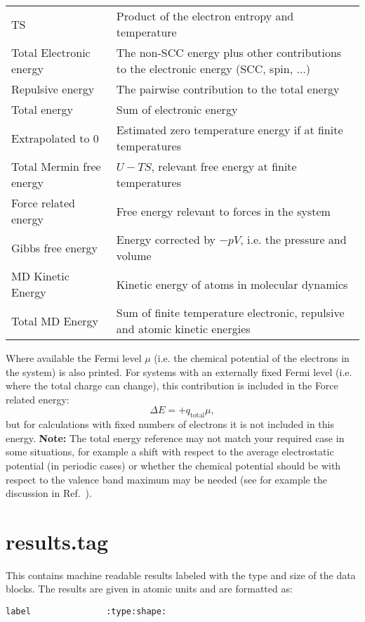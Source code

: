 \begin{center}
  \begin{tabular}{|l|p{5.5cm}|}
    \hline
    TS& Product of the electron entropy and temperature\\
    Total Electronic energy& The non-SCC energy plus other contributions to the
    electronic energy (SCC, spin, $\ldots$)\\
    Repulsive energy& The pairwise contribution to the total energy\\
    Total energy& Sum of electronic energy\\
    Extrapolated to 0& Estimated zero temperature energy if at finite
    temperatures\\
    Total Mermin free energy& $U - T S$, relevant free energy at finite
    temperatures\\
    Force related energy& Free energy relevant to forces in the system\\
    Gibbs free energy& Energy corrected by $- p V$, i.e. the pressure and volume\\
    MD Kinetic Energy& Kinetic energy of atoms in molecular dynamics\\
    Total MD Energy& Sum of finite temperature electronic, repulsive and atomic
    kinetic energies\\
    \hline
  \end{tabular}
\end{center}

Where available the Fermi level $\mu$ (i.e. the chemical potential of the
electrons in the system) is also printed. For systems with an externally fixed
Fermi level (i.e. where the total charge can change), this contribution is
included in the Force related energy: $$\Delta E = + q_\mathrm{total} \mu,$$ but
for calculations with fixed numbers of electrons it is not included in this
energy. \textbf{Note:} The total energy reference may not match your required
case in some situations, for example a shift with respect to the average
electrostatic potential (in periodic cases) or whether the chemical potential
should be with respect to the valence band maximum may be needed (see for
example the discussion in Ref.~\cite{Lany_2009}).

\section{results.tag}
\label{sec:dftbp.results}

This contains machine readable results labeled with the type and size of the
data blocks. The results are given in atomic units and are formatted as:
\begin{verbatim}
label               :type:shape:
\end{verbatim}

